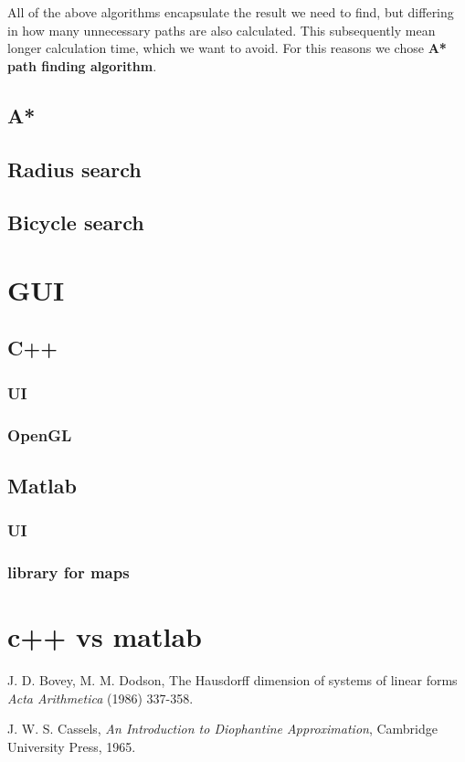 \documentclass[reqno,openany,12pt]{amsbook}
\theoremstyle{definition}
\theoremstyle{remark}
\begin{document}
All of the above algorithms encapsulate the result we need to find, but differing in how many unnecessary paths are also calculated. This subsequently mean longer calculation time, which we want to avoid. For this reasons we chose \textbf{A* path finding algorithm}.

\section{A*}




\section{Radius search}
\section{Bicycle search}
\chapter{GUI}
\section{C++}
\subsection{UI}
\subsection{OpenGL}
\section{Matlab}
\subsection{UI}
\subsection{library for maps}
\chapter{c++ vs matlab}




\begin{thebibliography}{99}

J. D. Bovey, M. M. Dodson,
The Hausdorff dimension of systems of linear forms
{\em Acta Arithmetica}
(1986) 337-358.

J. W. S. Cassels,
{\em An Introduction to Diophantine Approximation},
Cambridge University Press, 1965.



\end{thebibliography}
\end{document}

